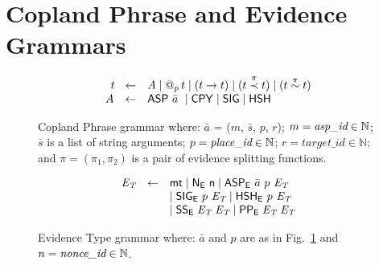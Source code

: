 \section{Copland Phrase and Evidence Grammars}
\label{sec:json}



\begin{figure}
  \[\begin{array}{rcl}
      \terms&\gets&A\mid\at{p}{t}\mid(t \linseqe t)\mid
                    (t\braseqe\pi t)\mid(t\brapare\pi t) \\
      A&\gets&\asptnn{\bar{a}}
               \mid\cpy\mid\sig\mid\hsh %
    \end{array}\]
  \caption{Copland Phrase grammar where: \newline
    $\bar{a}$ = ($m$, $\bar{s}$,
    $p$, $r$); $m = \emph{asp\_id}\in\mathbb{N}$; $\bar{s}$ is
    a list of string arguments; $p
    = \emph{place\_id}\in\mathbb{N}$; $r = target\_id\in\mathbb{N}$;  and $\pi = (\pi_1,\pi_2)$ is a pair of
    evidence splitting functions.
}
  \label{fig:term-grammar-json}
\end{figure}


\begin{figure}
  \[\begin{array}{rcl}
      \evt&\gets&\mtc\mid\Nt{\nidt}\mid\Ut{\bar{a}}{p}{\evt} \\
          & & \mid\Gt{p}{\evt}\mid\Ht{p}{\evt} \\
          & & \mid\SSt{\evt}{\evt}\mid\PPt{\evt}{\evt} %
    \end{array}\]
  \caption{Evidence Type grammar where: \newline
    $\bar{a}$ and $p$ are as in Fig.~\ref{fig:term-grammar-json} and
    $n = \emph{nonce\_id}\in\mathbb{N}$.}
  \label{fig:evidence_type-json}
\end{figure}


